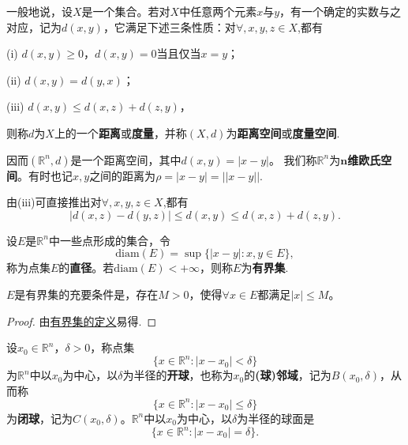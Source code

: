\documentclass[../../main.tex]{subfiles}%
\begin{document}
\begin{definition}[距离空间]\label{definition:距离空间}
一般地说，设\(X\)是一个集合。若对\(X\)中任意两个元素\(x\)与\(y\)，有一个确定的实数与之对应，记为\(d(x,y)\)，它满足下述三条性质：对$\forall,x,y,z\in X$,都有

(i) \(d(x,y)\geqslant0\)，\(d(x,y)=0\)当且仅当\(x = y\)；

(ii) \(d(x,y)=d(y,x)\)；

(iii) \(d(x,y)\leqslant d(x,z)+d(z,y)\)，

则称\(d\)为\(X\)上的一个\textbf{距离}或\textbf{度量}，并称\((X,d)\)为\textbf{距离空间}或\textbf{度量空间}.
\end{definition}
\begin{note}
因而\((\mathbb{R}^n,d)\)是一个距离空间，其中\(d(x,y)=|x - y|\)。
我们称\(\mathbb{R}^n\)为\textbf{\(\boldsymbol{n}\)维欧氏空间}。有时也记$x,y$之间的距离为$\rho = |x-y|=||x-y||.$
\end{note}
\begin{remark}
由(iii)可直接推出对$\forall,x,y,z\in X$,都有
\[
|d(x,z)-d(y,z)|\leqslant d(x,y)\leqslant d(x,z)+d(z,y).
\]
\end{remark}

\begin{definition}[点集的直径与有界集]\label{definition:点集的直径与有界集}
设\(E\)是\(\mathbb{R}^n\)中一些点形成的集合，令
\[\text{diam}(E)=\sup\{|x - y|:x,y\in E\},\]
称为点集\(E\)的\textbf{直径}。若\(\text{diam}(E)<+\infty\)，则称\(E\)为\textbf{有界集}.
\end{definition}

\begin{proposition}[有界集的充要条件]\label{proposition:有界集的充要条件}
  \(E\)是有界集的充要条件是，存在\(M > 0\)，使得\(\forall x\in E\)都满足\(|x|\leqslant M\)。
\end{proposition}
\begin{proof}

  由\hyperref[definition:点集的直径与有界集]{有界集的定义}易得.

\end{proof}

\begin{definition}[点的(球)邻域]\label{definition:点的(球)邻域}
  设\(x_0\in\mathbb{R}^n\)，\(\delta>0\)，称点集
\[\{x\in\mathbb{R}^n:|x - x_0|<\delta\}\]
为\(\mathbb{R}^n\)中以\(x_0\)为中心，以\(\delta\)为半径的\textbf{开球}，也称为\(x_0\)的\textbf{(球)邻域}，记为\(B(x_0,\delta)\)，从而称
\[\{x\in\mathbb{R}^n:|x - x_0|\leqslant\delta\}\]
为\textbf{闭球}，记为\(C(x_0,\delta)\)。\(\mathbb{R}^n\)中以\(x_0\)为中心，以\(\delta\)为半径的球面是
\[\{x\in\mathbb{R}^n:|x - x_0|=\delta\}.\]
\end{definition}
\end{document}
